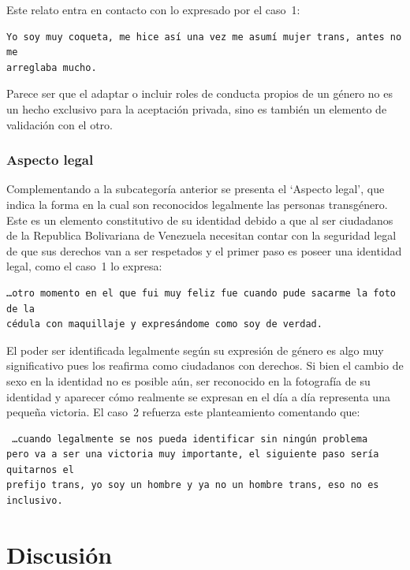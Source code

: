 Este relato entra en contacto con lo expresado por el caso~1:

\begin{verbatim}
Yo soy muy coqueta, me hice así una vez me asumí mujer trans, antes no me
arreglaba mucho.
\end{verbatim}

Parece ser que el adaptar o incluir roles de conducta propios de un género no es
un hecho exclusivo para la aceptación privada, sino es también un elemento
de validación con el otro.

\subsubsection{Aspecto legal}

Complementando a la subcategoría anterior se presenta el ‘Aspecto legal’, que
indica la forma en la cual son reconocidos legalmente las personas transgénero.
Este es un elemento constitutivo de su identidad debido a que al ser ciudadanos
de la Republica Bolivariana de Venezuela necesitan contar con la seguridad legal
de que sus derechos van a ser respetados y el primer paso es poseer una
identidad legal, como el caso~1 lo expresa:

\begin{verbatim}
…otro momento en el que fui muy feliz fue cuando pude sacarme la foto de la
cédula con maquillaje y expresándome como soy de verdad.
\end{verbatim}

El poder ser identificada legalmente según su expresión de género es algo muy
significativo pues los reafirma como ciudadanos con derechos. Si bien el cambio
de sexo en la identidad no es posible aún, ser reconocido en la fotografía de su
identidad y aparecer cómo realmente se expresan en el día a día representa una
pequeña victoria. El caso~2 refuerza este planteamiento comentando que:

\begin{verbatim} …cuando legalmente se nos pueda identificar sin ningún problema
pero va a ser una victoria muy importante, el siguiente paso sería quitarnos el
prefijo trans, yo soy un hombre y ya no un hombre trans, eso no es inclusivo.
\end{verbatim}

\section{Discusión}\label{sec:discusion}

